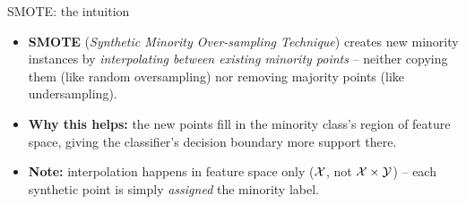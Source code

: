\documentclass[11pt,compress,t,notes=noshow, xcolor=table]{beamer}
\begin{document}

    
    
                
        


        
    

    


\begin{frame}{SMOTE: the intuition}
    \begin{itemize}
        \item \textbf{SMOTE} (\emph{Synthetic Minority Over-sampling Technique}) creates new minority instances by \emph{interpolating between existing minority points} -- neither copying them (like random oversampling) nor removing majority points (like undersampling).

        \item \textbf{Why this helps:} the new points fill in the minority class's region of feature space, giving the classifier's decision boundary more support there.

        \item \textbf{Note:} interpolation happens in feature space only ($\mathcal{X}$, not $\mathcal{X}\times\mathcal{Y}$) -- each synthetic point is simply \emph{assigned} the minority label.
    \end{itemize}
\end{frame}
\end{document}
